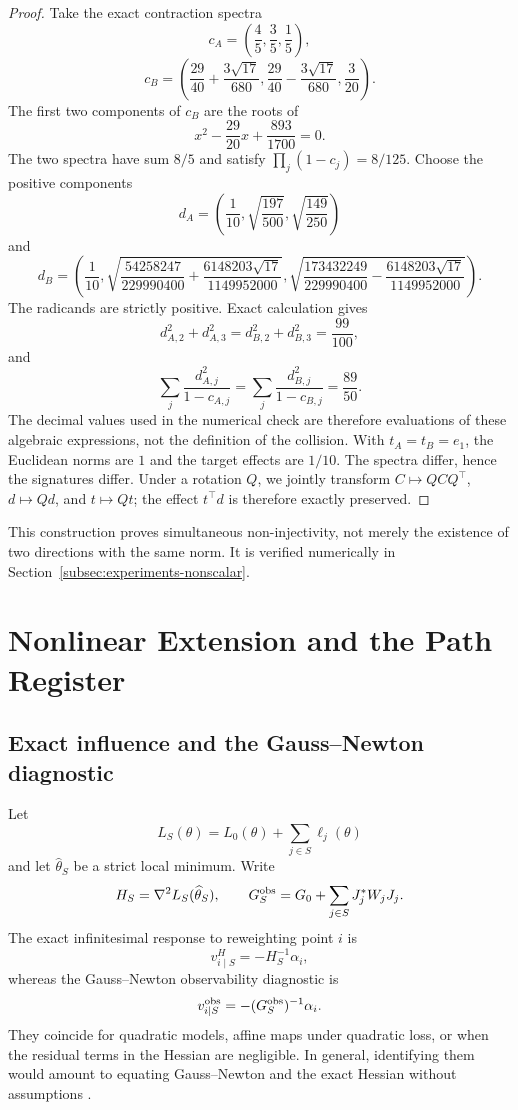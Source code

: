 \documentclass[10pt,a4paper]{article}
\begin{document}
\begin{proof}
Take the exact contraction spectra
\[
c_A=\left(\frac45,\frac35,\frac15\right),
\]
\[
c_B=\left(
\frac{29}{40}+\frac{3\sqrt{17}}{680},
\frac{29}{40}-\frac{3\sqrt{17}}{680},
\frac3{20}
\right).
\]
The first two components of $c_B$ are the roots of
\[
x^2-\frac{29}{20}x+\frac{893}{1700}=0.
\]
The two spectra have sum $8/5$ and satisfy $\prod_j(1-c_j)=8/125$. Choose the positive components
\[
d_A=
\left(
\frac1{10},
\sqrt{\frac{197}{500}},
\sqrt{\frac{149}{250}}
\right)
\]
and
\[
d_B=
\left(
\frac1{10},
\sqrt{
\frac{54258247}{229990400}
+
\frac{6148203\sqrt{17}}{1149952000}
},
\sqrt{
\frac{173432249}{229990400}
-
\frac{6148203\sqrt{17}}{1149952000}
}
\right).
\]
The radicands are strictly positive. Exact calculation gives
\[
d_{A,2}^2+d_{A,3}^2
=d_{B,2}^2+d_{B,3}^2
=\frac{99}{100},
\]
and
\[
\sum_j\frac{d_{A,j}^2}{1-c_{A,j}}
=
\sum_j\frac{d_{B,j}^2}{1-c_{B,j}}
=\frac{89}{50}.
\]
The decimal values used in the numerical check are therefore evaluations of these algebraic expressions, not the definition of the collision. With $t_A=t_B=e_1$, the Euclidean norms are $1$ and the target effects are $1/10$. The spectra differ, hence the signatures differ. Under a rotation $Q$, we jointly transform $C\mapsto QCQ^\top$, $d\mapsto Qd$, and $t\mapsto Qt$; the effect $t^\top d$ is therefore exactly preserved.
\end{proof}

This construction proves simultaneous non-injectivity, not merely the existence of two directions with the same norm. It is verified numerically in Section~\ref{subsec:experiments-nonscalar}.

\section{Nonlinear Extension and the Path Register}
\subsection{Exact influence and the Gauss--Newton diagnostic}
Let
\[
L_S(\theta)=L_0(\theta)+\sum_{j\in S}\ell_j(\theta)
\]
and let $\widehat\theta_S$ be a strict local minimum. Write
\[
H_S=\nabla^2L_S(\widehat\theta_S),
\qquad
G_S^{\rm obs}=G_0+\sum_{j\in S}J_j^*W_jJ_j.
\]
The exact infinitesimal response to reweighting point $i$ is
\begin{equation}
v_{i\mid S}^{H}=-H_S^{-1}\alpha_i,
\label{eq:exact-influence}
\end{equation}
whereas the Gauss--Newton observability diagnostic is
\begin{equation}
v_{i\mid S}^{\rm obs}=-(G_S^{\rm obs})^{-1}\alpha_i.
\label{eq:gn-influence}
\end{equation}
They coincide for quadratic models, affine maps under quadratic loss, or when the residual terms in the Hessian are negligible. In general, identifying them would amount to equating Gauss--Newton and the exact Hessian without assumptions \citep{schraudolph2002,martens2020}.
\end{document}
